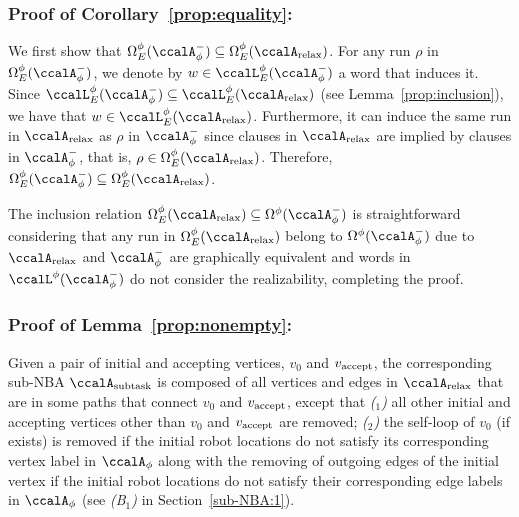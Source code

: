 \documentclass[Afour,sageh,times]{sagej}
\newcounter{mycounter}
\newcommand{\auto}[1]{\ccalA_{\textup{#1}}}
\newcommand{\autop}{\ccalA_{\phi}}
\newcommand{\vertex}[1]{v_{\textup{#1}}}
\begin{document}
{{\subsubsection{Proof of Corollary~\ref{prop:equality}:} \label{app:equality}
 We first show that  $\Omega_E^\phi(\autop^-) \subseteq  \Omega_E^\phi(\auto{relax})$. For any run $\rho$ in $\Omega_E^\phi(\autop^-)$, we denote by $w  \in  \ccalL^\phi_E(\autop^-)$ a word that induces it.  Since $\ccalL^\phi_E(\autop^-) \subseteq \ccalL^\phi_E(\auto{relax})$ (see Lemma~\ref{prop:inclusion}), we have that $w \in\ccalL^\phi_E(\auto{relax})$. Furthermore, it can induce the same run in $\auto{relax}$ as $\rho$  in $\autop^-$ since clauses in $\auto{relax}$ are implied by  clauses in $\autop^-$, that is, $\rho \in \Omega_E^\phi(\auto{relax}) $. Therefore, $\Omega_E^\phi(\autop^-) \subseteq  \Omega_E^\phi(\auto{relax})$.

   The inclusion relation $\Omega_E^\phi(\auto{relax}) \subseteq \Omega^\phi(\autop^-)$ is straightforward considering that  any  run in  $\Omega_E^\phi(\auto{relax})$  belong to  $\Omega^\phi(\autop^-)$ due to $\auto{relax}$ and $\autop^-$ are graphically equivalent and words in $\ccalL^\phi(\autop^-)$ do not consider the realizability, completing the proof.

   \subsubsection{Proof of Lemma~\ref{prop:nonempty}:}\label{app:nonempty}
Given a pair of initial and accepting vertices, $v_0$ and $\vertex{accept}$, the corresponding sub-NBA $\auto{subtask}$ is composed of all vertices and edges in $\auto{relax}$ that are in some paths that connect $v_0$ and $\vertex{accept}$, except that {\it ($_1$)} all other initial and accepting vertices other than $v_0$ and $\vertex{accept}$ are removed; {\it ($_2$)} the self-loop of $v_0$ (if exists) is removed if the initial robot locations do not satisfy its corresponding vertex label in $\autop$ along with the removing of  outgoing edges of the initial vertex if the initial robot locations do not satisfy their corresponding edge labels in $\autop$ (see {\it (B$_1$)} in Section~\ref{sub-NBA:1}). %

}}
\end{document}
